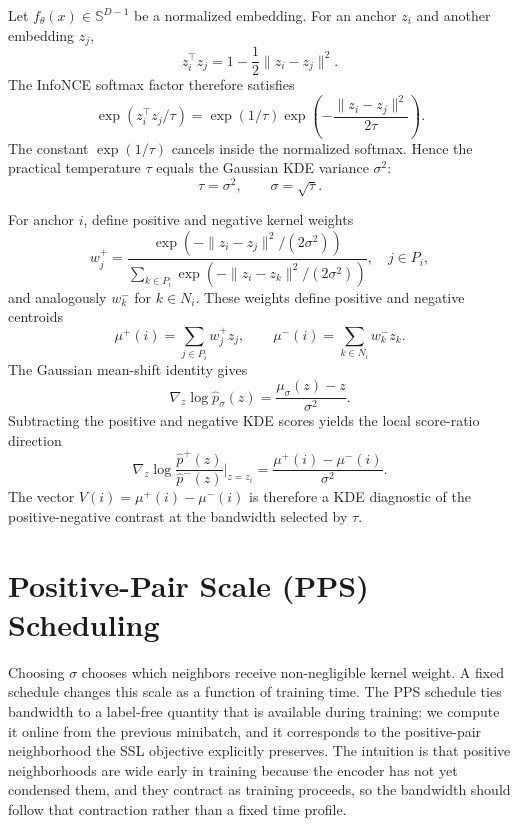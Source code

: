 \documentclass{article}
\begin{document}
Let $f_\theta(x)\in\mathbb{S}^{D-1}$ be a normalized embedding. For an anchor $z_i$ and another embedding $z_j$,
\begin{equation}
z_i^\top z_j
=
1-\frac{1}{2}\|z_i-z_j\|^2 .
\end{equation}
The InfoNCE softmax factor therefore satisfies
\begin{equation}
\exp(z_i^\top z_j/\tau)
=
\exp(1/\tau)
\exp\!\left(-\frac{\|z_i-z_j\|^2}{2\tau}\right).
\end{equation}
The constant $\exp(1/\tau)$ cancels inside the normalized softmax. Hence the practical temperature $\tau$ equals the Gaussian KDE variance $\sigma^2$:
\begin{equation}
\tau=\sigma^2, \qquad \sigma=\sqrt{\tau}.
\end{equation}

For anchor $i$, define positive and negative kernel weights
\begin{equation}
w_j^+
=
\frac{\exp(-\|z_i-z_j\|^2/(2\sigma^2))}
{\sum_{k\in P_i}\exp(-\|z_i-z_k\|^2/(2\sigma^2))},
\quad j\in P_i,
\end{equation}
and analogously $w_k^-$ for $k\in N_i$. These weights define positive and negative centroids
\begin{equation}
\mu^+(i)=\sum_{j\in P_i}w_j^+z_j,
\qquad
\mu^-(i)=\sum_{k\in N_i}w_k^-z_k.
\end{equation}
The Gaussian mean-shift identity gives
\begin{equation}
\nabla_z\log\hat p_\sigma(z)
=
\frac{\mu_\sigma(z)-z}{\sigma^2}.
\end{equation}
Subtracting the positive and negative KDE scores yields the local score-ratio direction
\begin{equation}
\nabla_z\log\frac{\hat p^+(z)}{\hat p^-(z)}
\bigg|_{z=z_i}
=
\frac{\mu^+(i)-\mu^-(i)}{\sigma^2}.
\end{equation}
The vector $V(i)=\mu^+(i)-\mu^-(i)$ is therefore a KDE diagnostic of the positive-negative contrast at the bandwidth selected by $\tau$.

\section{Positive-Pair Scale (PPS) Scheduling}
\label{sec:scheduling}

Choosing $\sigma$ chooses which neighbors receive non-negligible kernel weight. A fixed schedule changes this scale as a function of training time. The PPS schedule ties bandwidth to a label-free quantity that is available during training: we compute it online from the previous minibatch, and it corresponds to the positive-pair neighborhood the SSL objective explicitly preserves. The intuition is that positive neighborhoods are wide early in training because the encoder has not yet condensed them, and they contract as training proceeds, so the bandwidth should follow that contraction rather than a fixed time profile.
\end{document}
